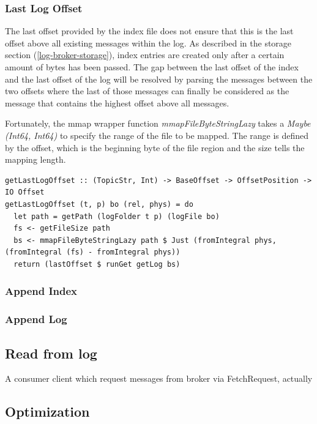 
\subsubsection{Last Log Offset}

The last offset provided by the index file does not ensure that this is the
last offset above all existing messages within the log. As described in the
storage section (\ref{log-broker-storage}), index entries are created only after a
certain amount of bytes has been passed. The gap between the last offset of the
index and the last offset of the log will be resolved by parsing the messages
between the two offsets where the last of those messages can finally be
considered as the message that contains the highest offset above all messages. 

Fortunately, the mmap wrapper function \textit{mmapFileByteStringLazy} takes a
\textit{Maybe (Int64, Int64)} to specify the range of the file to be mapped.
The range is defined by the offset, which is the beginning byte of the file
region and the size tells the mapping length.

\begin{lstlisting}[caption={Get last message offset from log, start at position given}]
getLastLogOffset :: (TopicStr, Int) -> BaseOffset -> OffsetPosition -> IO Offset
getLastLogOffset (t, p) bo (rel, phys) = do
  let path = getPath (logFolder t p) (logFile bo)
  fs <- getFileSize path
  bs <- mmapFileByteStringLazy path $ Just (fromIntegral phys, (fromIntegral (fs) - fromIntegral phys))
  return (lastOffset $ runGet getLog bs)
\end{lstlisting}

\subsubsection{Append Index}

\subsubsection{Append Log}


\subsection{Read from log}
A consumer client which request messages from broker via FetchRequest, actually

\subsection{Optimization}

